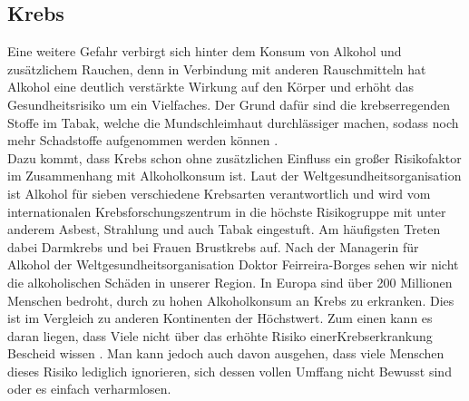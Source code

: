 \documentclass[12pt]{article}
\begin{document}
\subsection{Krebs}                                                                                                                
Eine weitere Gefahr verbirgt sich hinter dem Konsum von Alkohol und zusätzlichem Rauchen, denn in Verbindung mit anderen Rauschmitteln hat Alkohol eine deutlich verstärkte Wirkung auf den Körper und erhöht das Gesundheitsrisiko um ein Vielfaches. Der Grund dafür sind die krebserregenden Stoffe im Tabak, welche die Mundschleimhaut durchlässiger machen, sodass noch mehr Schadstoffe aufgenommen werden können \autocite{seufferlein_alkoholkonsum_2022}. \\
Dazu kommt, dass Krebs schon ohne zusätzlichen Einfluss ein großer Risikofaktor im Zusammenhang mit Alkoholkonsum ist. Laut der Weltgesundheitsorganisation ist Alkohol für sieben verschiedene Krebsarten verantwortlich und wird vom internationalen Krebsforschungszentrum in die höchste Risikogruppe mit unter anderem Asbest, Strahlung und auch Tabak eingestuft. Am häufigsten Treten dabei Darmkrebs und bei Frauen Brustkrebs auf. Nach der Managerin für Alkohol der Weltgesundheitsorganisation Doktor Feirreira-Borges sehen wir nicht die alkoholischen Schäden in unserer Region. In Europa sind über 200 Millionen Menschen bedroht, durch zu hohen Alkoholkonsum an Krebs zu erkranken. Dies ist im Vergleich zu anderen Kontinenten der Höchstwert. Zum einen kann es daran liegen, dass Viele nicht über das erhöhte Risiko einerKrebserkrankung Bescheid wissen \autocite{noauthor_beim_nodate}. Man kann jedoch auch davon ausgehen, dass viele Menschen dieses Risiko lediglich ignorieren, sich dessen vollen Umffang nicht Bewusst sind oder es einfach verharmlosen. \\
\end{document}
